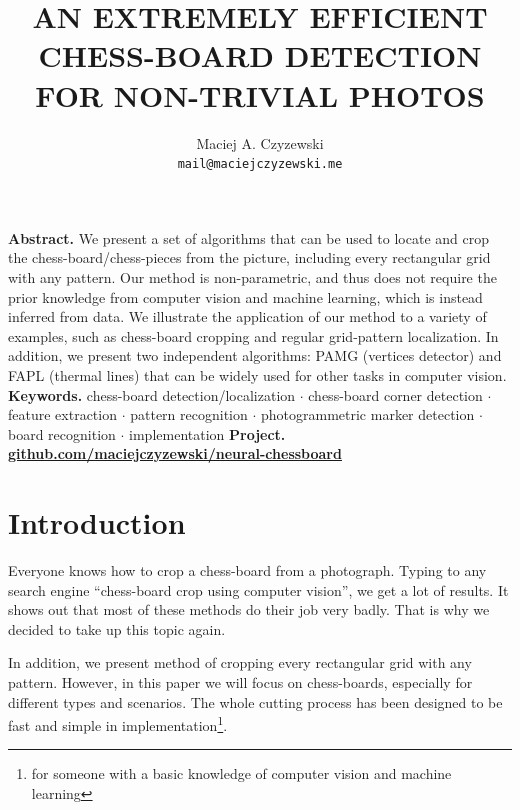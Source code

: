 \documentclass[letterpaper, 12pt]{article}
\title{\fontsize{18.5}{14.4}\textbf{\MakeUppercase{%
An Extremely Efficient Chess-board Detection for Non-trivial Photos}}}
\author{
  Maciej A. Czyzewski\\
  \texttt{mail@maciejczyzewski.me}
}
\begin{document}
\maketitle


\noindent\textbf{Abstract.} 
We present a set of algorithms that can be used to locate and crop the chess-board/chess-pieces from the picture, including every rectangular grid with any pattern.
Our method is non-parametric, and thus does not require the prior knowledge from
computer vision and machine learning, which is instead inferred from data.
We illustrate the application of our method to a variety of examples, such as
chess-board cropping and regular grid-pattern localization.
In addition, we present two independent algorithms: PAMG (vertices detector) and
FAPL (thermal lines) that can be widely used for other tasks in computer vision.
\newline\newline
\noindent\textbf{Keywords.} chess-board detection/localization $\cdot$ chess-board corner detection $\cdot$ feature extraction $\cdot$ pattern recognition $\cdot$ photogrammetric marker detection $\cdot$ board recognition $\cdot$ implementation
\newline\newline
\noindent\textbf{Project.} \hfill
\href{http://github.com/maciejczyzewski/neural-chessboard}{\textbf{github.com/maciejczyzewski/neural-chessboard}}


\section{Introduction}

Everyone knows how to crop a chess-board from a photograph.
Typing to any search engine ``chess-board crop using computer vision'', we
get a lot of results. It shows out that most of these methods do their job very
badly. That is why we decided to take up this topic again.

In addition, we present method of cropping every rectangular grid with any
pattern. However, in this paper we will focus on chess-boards, especially for different types and scenarios.
The whole cutting process has been designed to be fast and simple in
implementation\footnote{for someone with a basic knowledge of computer vision and machine learning}.
\end{document}
